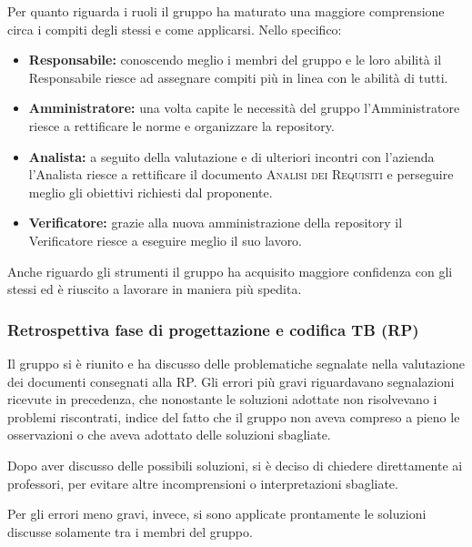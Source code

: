 \documentclass[../piano_di_qualifica.tex]{subfiles}
\begin{document}
Per quanto riguarda i ruoli il gruppo ha maturato una maggiore comprensione circa i compiti degli stessi e come applicarsi. Nello specifico:
\begin{itemize}
	\item \textbf{Responsabile:} conoscendo meglio i membri del gruppo e le loro abilità il Responsabile riesce ad assegnare compiti più in linea con le abilità di tutti.
	\item \textbf{Amministratore:} una volta capite le necessità del gruppo l'Amministratore riesce a rettificare le norme e organizzare la repository.
	\item \textbf{Analista:} a seguito della valutazione e di ulteriori incontri con l'azienda l'Analista riesce a rettificare il documento \textsc{Analisi dei Requisiti} e perseguire meglio gli obiettivi richiesti dal proponente.
	\item \textbf{Verificatore:} grazie alla nuova amministrazione della repository il Verificatore riesce a eseguire meglio il suo lavoro.
\end{itemize}

Anche riguardo gli strumenti il gruppo ha acquisito maggiore confidenza con gli stessi ed è riuscito a lavorare in maniera più spedita.

\subsubsection{Retrospettiva fase di progettazione e codifica TB (RP)}
\label{par:retrospettiva-RP}

Il gruppo si è riunito e ha discusso delle problematiche segnalate nella valutazione dei documenti consegnati alla RP. Gli errori più gravi riguardavano segnalazioni ricevute in precedenza, che nonostante le soluzioni adottate non risolvevano i problemi riscontrati, indice del fatto che il gruppo non aveva compreso a pieno le osservazioni o che aveva adottato delle soluzioni sbagliate.

Dopo aver discusso delle possibili soluzioni, si è deciso di chiedere direttamente ai professori, per evitare altre incomprensioni o interpretazioni sbagliate.

Per gli errori meno gravi, invece, si sono applicate prontamente le soluzioni discusse solamente tra i membri del gruppo.
\end{document}
